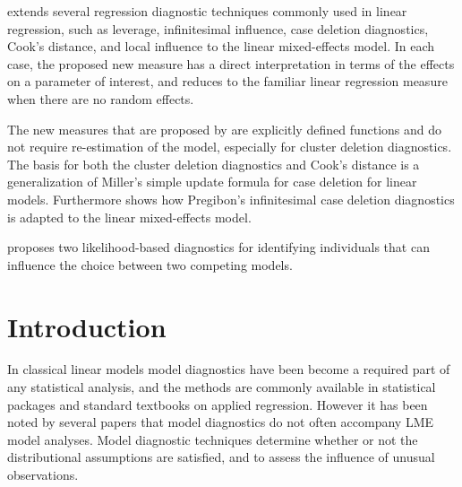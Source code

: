 \documentclass[12pt, a4paper]{article}
\begin{document}
			
			\citet{Demi} extends several regression diagnostic techniques commonly used in linear regression, such as leverage, infinitesimal influence, case deletion diagnostics, Cook's distance, and local influence to the linear mixed-effects model. In each case, the proposed new measure has a direct interpretation in terms of the effects on a parameter of interest, and reduces to the familiar linear regression measure when there are no random effects. 
			
			The new measures that are proposed by \citet{Demi} are explicitly defined functions and do not require re-estimation of the model, especially for cluster deletion diagnostics. The basis for both the cluster deletion diagnostics and Cook's distance is a generalization of Miller's simple update formula for case deletion for linear models. Furthermore \citet{Demi} shows how Pregibon's infinitesimal case deletion diagnostics is adapted to the linear mixed-effects model. 
			
			
			
			\citet{Demi} proposes two likelihood-based diagnostics for identifying individuals that can influence the choice between two competing models.
			
			
			
\section{Introduction}%
In classical linear models model diagnostics have been become a required part of any statistical analysis, and the methods are commonly available in statistical packages and standard textbooks on applied regression. However it has been noted by several papers that model diagnostics do not often accompany LME model analyses. Model diagnostic techniques determine whether or not the distributional assumptions are satisfied, and to assess the influence of unusual observations.
	
\end{document}

